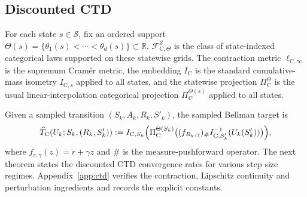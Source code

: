 \documentclass{article}
\newcommand{\X}{\mathcal{S}}
\begin{document}
\subsection{Discounted CTD}\label{sec:ctd-new2}
For each state $s\in\X$, fix an ordered support $\Theta(s)=\{\theta_1(s)<\cdots<\theta_d(s)\}\subset\mathbb R$. $\mathcal F^{\X}_{\mathrm C,\Theta}$ is the class of state-indexed categorical laws supported on these statewise grids. The contraction metric $\ell_{\mathrm C, \infty}$ is the supremum Cram\'er metric, the embedding $I_{\mathrm C}$ is the standard cumulative-mass isometry $I_{\mathrm C, s}$ \citep{rowland2018analysis, bellemare2023distributional} applied to all states, and the statewise projection $\Pi_{\mathrm C}^{\Theta}$ is the usual linear-interpolation categorical projection $\Pi_{\mathrm C}^{\Theta(s)}$ applied to all states.

Given a sampled transition $(S_k,A_k,R_k,S'_k)$, the sampled Bellman target is
\begin{equation}
\widehat T_{\mathrm C}(U_k;S_k,(R_k,S'_k)) :=I_{\mathrm C,S_k}\Bigl(\Pi_{\mathrm C}^{\Theta(S_k)}\bigl((f_{R_k,\gamma})_\# I_{\mathrm C, S'_k}^{-1}(U_k(S'_k))\bigr)\Bigr),
\end{equation}
where $f_{r,\gamma}(z)=r+\gamma z$ and $\#$ is the measure-pushforward operator. The next theorem states the discounted CTD convergence rates for various step size regimes. Appendix~\ref{app:ctd} verifies the contraction, Lipschitz continuity and perturbation ingredients and records the explicit constants.
\end{document}

